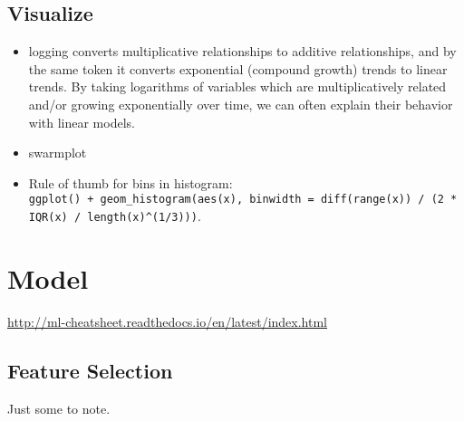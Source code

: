 \documentclass[]{book}
\theoremstyle{definition}
\theoremstyle{definition}
\theoremstyle{definition}
\theoremstyle{remark}
\begin{document}
\section{Visualize}\label{visualize}

\begin{itemize}
\item
  logging converts multiplicative relationships to additive
  relationships, and by the same token it converts exponential (compound
  growth) trends to linear trends. By taking logarithms of variables
  which are multiplicatively related and/or growing exponentially over
  time, we can often explain their behavior with linear models.
\item
  swarmplot
\item
  Rule of thumb for bins in histogram:
  \texttt{ggplot()\ +\ geom\_histogram(aes(x),\ binwidth\ =\ diff(range(x))\ /\ (2\ *\ IQR(x)\ /\ length(x)\^{}(1/3)))}.
\end{itemize}

\chapter{Model}\label{model}

\url{http://ml-cheatsheet.readthedocs.io/en/latest/index.html}

\section{Feature Selection}\label{feature-selection}

Just some to note.
\end{document}
